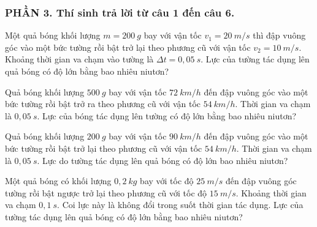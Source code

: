 \subsubsection*{PHẦN 3. Thí sinh trả lời từ câu 1 đến câu 6.}
\setcounter{ex}{0} 
\begin{ex}%
Một quả bóng khối lượng $m = 200\ g$ bay với vận tốc $v_1 = 20\ m/s$ thì đập vuông góc vào một bức tường rồi bật trở lại theo phương cũ với vận tốc $v_2= 10\ m/s$. Khoảng thời gian va chạm vào tường là $\Delta t = 0,05\ s$. Lực của tường tác dụng lên quả bóng có độ lớn bằng bao nhiêu niutơn?
 \end{ex}
\begin{ex}%
Quả bóng khối lượng $500\ g$ bay với vận tốc $72\ km/h$ đến đập vuông góc vào một bức tường rồi bật trở ra theo phương cũ với vận tốc $54\ km/h$. Thời gian va chạm là $0,05\ s$. Lực của bóng tác dụng lên tường có độ lớn bằng bao nhiêu niutơn?
 \end{ex}
\begin{ex}%
Quả bóng khối lượng $200\ g$ bay với vận tốc $90\ km/h$ đến đập vuông góc vào một bức tường rồi bật trở lại theo phương cũ với vận tốc $54\ km/h$. Thời gian va chạm là $0,05\ s$. Lực do tường tác dụng lên quả bóng có độ lớn bao nhiêu niutơn?
\loigiai{}
\end{ex}
\begin{ex}%
Một quả bóng có khối lượng $0,2\ kg$ bay với tốc độ $25\ m/s$ đến đập vuông góc tường rồi bật ngược trở lại theo phương cũ với tốc độ $15\ m/s$. Khoảng thời gian va chạm $0,1\ s$. Coi lực này là không đổi trong suốt thời gian tác dụng. Lực của tường tác dụng lên quả bóng có độ lớn bằng bao nhiêu niutơn?
 \end{ex}
